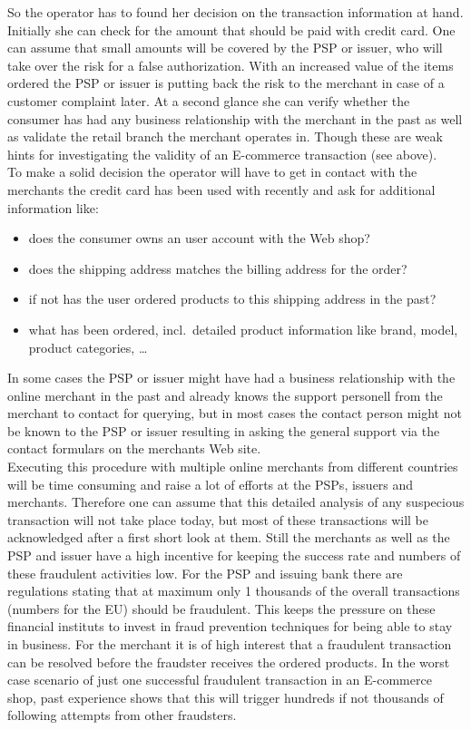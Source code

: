 So the operator has to found her decision on the transaction information at hand. Initially she can check for the amount that should be paid with credit card. One can assume that small amounts will be covered by the \gls{PSP} or issuer, who will take over the risk for a false authorization. With an increased value of the items ordered the \gls{PSP} or issuer is putting back the risk to the merchant in case of a customer complaint later. At a second glance she can verify whether the consumer has had any business relationship with the merchant in the past as well as validate the retail branch the merchant operates in. Though these are weak hints for investigating the validity of an E-commerce transaction (see above). \\

To make a solid decision the operator will have to get in contact with the merchants the credit card has been used with recently and ask for additional information like:\@

\begin{itemize}
  \item does the consumer owns an user account with the Web shop?
  \item does the shipping address matches the billing address for the order?
  \item if not has the user ordered products to this shipping address in the past?
  \item what has been ordered, incl.\ detailed product information like brand, model, product categories, \ldots
\end{itemize}

In some cases the \gls{PSP} or issuer might have had a business relationship with the online merchant in the past and already knows the support personell from the merchant to contact for querying, but in most cases the contact person might not be known to the \gls{PSP} or issuer resulting in asking the general support via the contact formulars on the merchants Web site. \\

Executing this procedure with multiple online merchants from different countries will be time consuming and raise a lot of efforts at the \gls{PSP}s, issuers and merchants. Therefore one can assume that this detailed analysis of any suspecious transaction will not take place today, but most of these transactions will be acknowledged after a first short look at them. Still the merchants as well as the \gls{PSP} and issuer have a high incentive for keeping the success rate and numbers of these fraudulent activities low. For the \gls{PSP} and issuing bank there are regulations stating that at maximum only 1 thousands of the overall transactions (numbers for the EU) should be fraudulent. This keeps the pressure on these financial instituts to invest in fraud prevention techniques for being able to stay in business. For the merchant it is of high interest that a fraudulent transaction can be resolved before the fraudster receives the ordered products. In the worst case scenario of just one successful fraudulent transaction in an E-commerce shop, past experience shows that this will trigger hundreds if not thousands of following attempts from other fraudsters. \\



